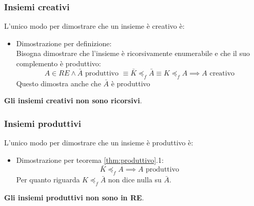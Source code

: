 \documentclass[a4paper]{article}
\begin{document}
\subsubsection{Insiemi creativi}
L'unico modo per dimostrare che un insieme è creativo è:
\begin{itemize}
  \item Dimostrazione per definizione: \\
    Bisogna dimostrare che l'insieme è ricorsivamente enumerabile e che il suo
    complemento è produttivo:
    \[
      A \in RE \land \bar{A} \text{ produttivo } \equiv \bar{K} \preceq_f \bar{A} \equiv K \preceq_f A
      \implies A \text{ creativo}
    \]
    Questo dimostra anche che \( \bar{A} \) è produttivo
\end{itemize}
\textbf{Gli insiemi creativi non sono ricorsivi}.

\subsubsection{Insiemi produttivi}
L'unico modo per dimostrare che un insieme è produttivo è:
\begin{itemize}
  \item Dimostrazione per teorema \ref{thm:produttivo}.1:
    \[
      \bar{K} \preceq_f A \implies A \text{ produttivo}
    \] 
    Per quanto riguarda \( K \preceq_f \bar{A} \) non dice nulla su \( \bar{A} \).
\end{itemize}
\textbf{Gli insiemi produttivi non sono in RE}.
\end{document}

